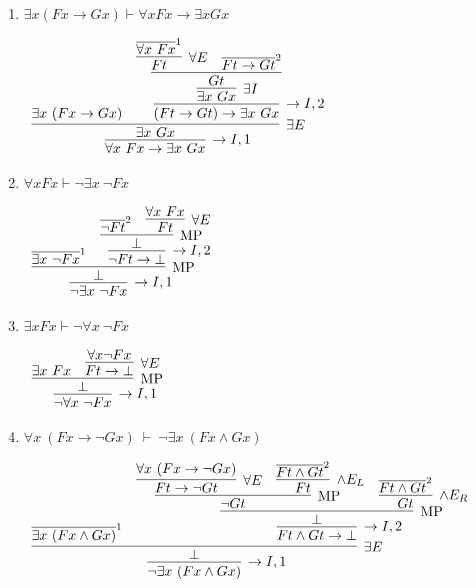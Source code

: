 \documentclass[11pt]{report}
\newcommand{\temp}[2]{{\overline{#2}}^{#1}}
\begin{document}
\begin{enumerate}
\begin{enumerate}
			\newpage
			\item $\exists x (Fx \to Gx)  \vdash  \forall x Fx \to \exists x Gx$
			
			\begin{center}
				$\begin{array}{c}
					\infer[\to I,1]{\forall x \ Fx \to \exists x \ Gx}
						{\infer[\exists E]{\exists x \ Gx}
							{\exists x \ (Fx \to Gx)
							&
							\infer[\to I,2]{(Ft \to Gt) \to \exists x \ Gx}
								{\infer[\exists I]{\exists x \ Gx}
									{\infer[]{Gt}
										{\infer[\forall E]{Ft}
											{\temp{1}{\forall x \ Fx}}
										&
										\temp{2}{Ft \to Gt}}}}}}
				\end{array}$
			\end{center}
			
			\item $\forall x Fx \vdash \lnot \exists x \ \lnot Fx$ 
			
			\begin{center}
				$\begin{array}{c}
					\infer[\to I,1]{\lnot \exists x \ \lnot Fx}
						{\infer[\MP]{\bot}
							{\temp{1}{\exists x \ \lnot Fx}
							&
							\infer[\to I,2]{\lnot Ft \to \bot}
								{\infer[\MP]{\bot}
									{\temp{2}{\lnot Ft}
									&
									\infer[\forall E]{Ft}
										{\forall x \ Fx}}}}}
				\end{array}$
			\end{center}
			
			\item $\exists x Fx \vdash \lnot \forall x \ \lnot Fx$
			
			\begin{center}
				$\begin{array}{c}
					\infer[\to I,1]{\lnot \forall x \ \lnot Fx}
						{\infer[\MP]{\bot}
							{\exists x \ Fx
							&
							\infer[\forall E]{Ft \to \bot}
								{\forall x \lnot Fx}}}
				\end{array}$
			\end{center}
			
			\item $\forall x \ (Fx \to \lnot Gx) \ \vdash \ \lnot \exists x \ (Fx \land Gx)$
			
			\begin{center}
				$\begin{array}{c}
					\infer[\to I,1]{\lnot \exists x \ (Fx \land Gx)}
						{\infer[\exists E]{\bot}
							{\temp{1}{\exists x \ (Fx \land Gx)}
							&
							\infer[\to I,2]{Ft \land Gt \to \bot}
								{\infer[\MP]{\bot}
									{\infer[\MP]{\lnot Gt}
										{\infer[\forall E]{Ft \to \lnot Gt}
											{\forall x \ (Fx \to \lnot Gx)}
										&
										\infer[\land E_{L}]{Ft}
											{\temp{2}{Ft \land Gt}}}
									&
									\infer[\land E_{R}]{Gt}
										{\temp{2}{Ft \land Gt}}}}}}
				\end{array}$
			\end{center}


\end{enumerate}
\end{enumerate}
\end{document}

